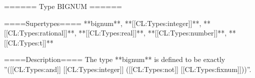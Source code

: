 ====== Type BIGNUM ======

====Supertypes====
**bignum**, **[[CL:Types:integer]]**, **[[CL:Types:rational]]**, **[[CL:Types:real]]**, **[[CL:Types:number]]**, **[[CL:Types:t]]**

====Description====
The type **bignum** is defined to be exactly ''([[CL:Types:and]] [[CL:Types:integer]] ([[CL:Types:not]] [[CL:Types:fixnum]]))''.

 
